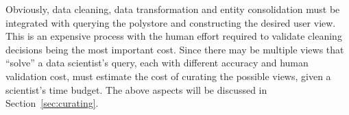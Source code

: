 

Obviously, data cleaning, data transformation and entity consolidation must be
integrated with querying the polystore and constructing the desired user view.
This is an expensive process with the human effort required to validate cleaning
decisions being the most important cost.  Since there may be multiple views that
``solve'' a data scientist's query, each with different accuracy and human
validation cost, \dcv must estimate the cost of curating the possible views,
given a scientist's time budget.  The above aspects will be discussed in
Section~\ref{sec:curating}.








